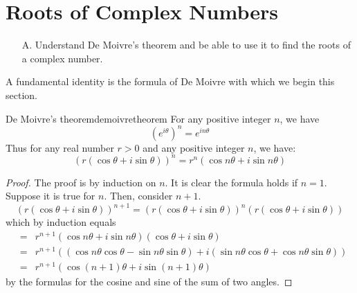 \section{Roots of Complex Numbers}

\begin{outcome}
\begin{enumerate}
\item[A.] Understand De Moivre's theorem and be able to use it to find the
roots of a complex number.
\end{enumerate}
\end{outcome}

A fundamental identity is the
 formula of De Moivre with which we begin this section.

\begin{theorem}{De Moivre's theorem}{demoivretheorem}
For any positive integer $n$, we have
\begin{equation*}
\left( e^{i \theta} \right)^n = e^{i n \theta}
\end{equation*}
Thus for any real number $r>0$ and any positive integer $n$, we have:
\begin{equation*}
\left( r\left( \cos \theta+i\sin \theta\right) \right) ^{n}=r^{n}\left( \cos n \theta +i\sin
n\theta\right) 
\end{equation*}
\end{theorem}

\begin{proof}
 The proof is by induction on $n$. It is clear the formula holds if $n=1.$ Suppose it is true
for $n.$ Then, consider $n+1$.
\begin{equation*}
\left( r\left( \cos \theta+i\sin \theta\right) \right) ^{n+1}=\left( r\left( \cos
\theta+i\sin \theta\right) \right) ^{n}\left( r\left( \cos \theta+i\sin \theta\right) \right)
\end{equation*}
which by induction equals
\begin{eqnarray*}
&=&r^{n+1}\left( \cos n\theta+i\sin n\theta\right) \left( \cos \theta+i\sin \theta\right) \\
&=& r^{n+1}\left( \left( \cos n\theta\cos \theta-\sin n\theta\sin \theta\right) +i\left( \sin
n\theta\cos \theta+\cos n\theta\sin \theta\right) \right)\\
&=&r^{n+1}\left( \cos \left( n+1\right) \theta+i\sin \left( n+1\right) \theta\right)
\end{eqnarray*}
by the formulas for the cosine and sine of the sum of two angles. 
\end{proof}

